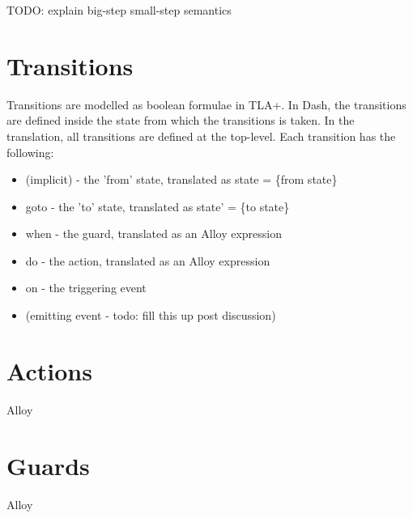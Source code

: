TODO: explain big-step small-step semantics

\section{Transitions}

Transitions are modelled as boolean formulae in TLA+. In Dash, the transitions are defined inside the state from which the transitions is taken. In the translation, all transitions are defined at the top-level. Each transition has the following:

\begin{itemize}
	\item (implicit) - the 'from' state, translated as state = \{from state\}
	\item goto - the 'to' state, translated as state' = \{to state\}
	\item when - the guard, translated as an Alloy expression
	\item do - the action, translated as an Alloy expression
	\item on - the triggering event
	\item (emitting event - todo: fill this up post discussion)
\end{itemize}

\section{Actions}

Alloy

\section{Guards}

Alloy



